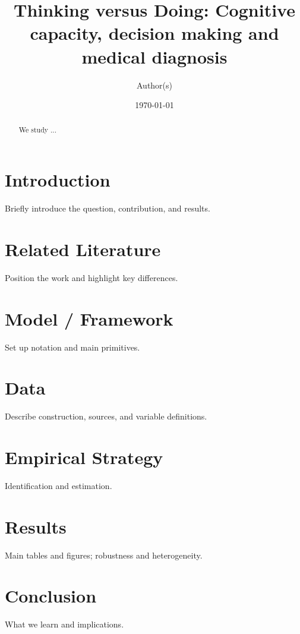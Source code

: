 \documentclass{draft}
\title{Thinking versus Doing: Cognitive capacity, decision making and medical diagnosis}
\author{Author(s)}
\date{\today}
\begin{document}
\maketitle

\begin{abstract}
We study ...
\end{abstract}

\section{Introduction}
Briefly introduce the question, contribution, and results.

\section{Related Literature}
Position the work and highlight key differences.

\section{Model / Framework}
Set up notation and main primitives.

\section{Data}
Describe construction, sources, and variable definitions.

\section{Empirical Strategy}
Identification and estimation.

\section{Results}
Main tables and figures; robustness and heterogeneity.

\section{Conclusion}
What we learn and implications.

% 
% 
\end{document}
